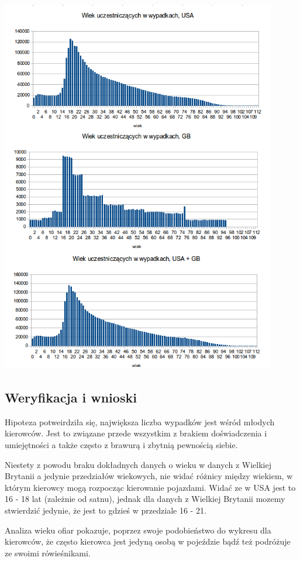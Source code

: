 \centerline{\includegraphics[width=0.9\textwidth]{images/statistics/person_age.png}}

\subsection{Weryfikacja i wnioski}\label{weryfikacja-i-wnioski}

Hipoteza potweirdziła się, największa liczba wypadków jest wśród młodych
kierowców. Jest to związane przede wszystkim z brakiem doświadczenia i
umiejętności a także często z brawurą i zbytnią pewnością siebie.

Niestety z powodu braku dokładnych danych o wieku w danych z Wielkiej
Brytanii a jedynie przedziałów wiekowych, nie widać różnicy między
wiekiem, w którym kierowcy mogą rozpocząc kierowanie pojazdami. Widać ze
w USA jest to 16 - 18 lat (zależnie od satnu), jednak dla danych z
Wielkiej Brytanii mozemy stwierdzić jedynie, że jest to gdzieś w
przedziale 16 - 21.

Analiza wieku ofiar pokazuje, poprzez swoje podobieństwo do wykresu dla
kierowców, że często kierowca jest jedyną osobą w pojeździe bądź też
podróżuje ze swoimi rówieśnikami.
